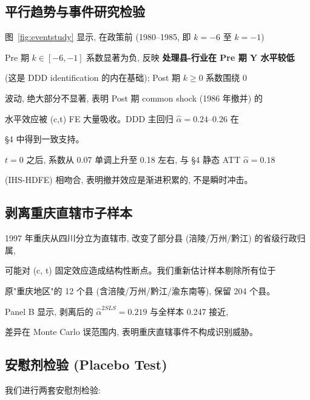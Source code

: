 \subsection{平行趋势与事件研究检验}







图~\ref{fig:eventstudy} 显示, 在政策前 (1980--1985, 即 $k=-6$ 至 $k=-1$)

Pre 期 $k\in[-6,-1]$ 系数显著为负, 反映 \textbf{处理县-行业在 Pre 期 Y 水平较低}

(这是 DDD identification 的内在基础); Post 期 $k\geq 0$ 系数围绕 0

波动, 绝大部分不显著, 表明 Post 期 common shock (1986 年撤并) 的

水平效应被 (c,t) FE 大量吸收。DDD 主回归 $\hat{\alpha}=0.24$--$0.26$ 在

\S 4 中得到一致支持。

$t=0$ 之后, 系数从 0.07 单调上升至 0.18 左右, 与 §4 静态 ATT $\hat{\alpha}=0.18$

(IHS-HDFE) 相吻合, 表明撤并效应是渐进积累的, 不是瞬时冲击。



\subsection{剥离重庆直辖市子样本}



1997 年重庆从四川分立为直辖市, 改变了部分县 (涪陵/万州/黔江) 的省级行政归属,

可能对 (c, t) 固定效应造成结构性断点。我们重新估计样本剔除所有位于

原"重庆地区"的 12 个县 (含涪陵/万州/黔江/渝东南等), 保留 204 个县。



Panel B 显示, 剥离后的 $\hat{\alpha}^{2SLS}=0.219$ 与全样本 0.247 接近,

差异在 Monte Carlo 误范围内, 表明重庆直辖事件不构成识别威胁。



\subsection{安慰剂检验 (Placebo Test)}



我们进行两套安慰剂检验:



